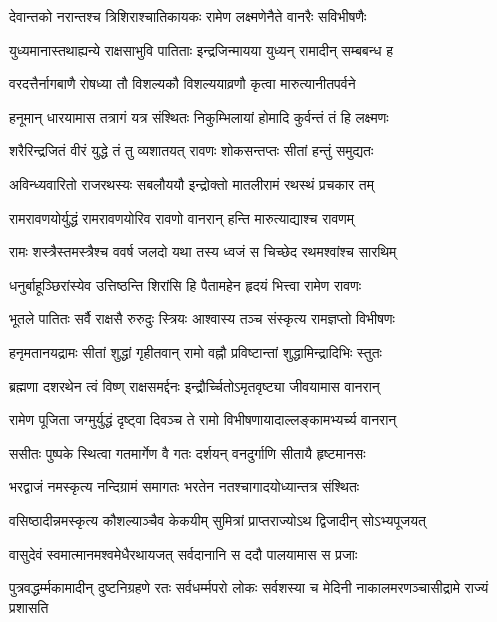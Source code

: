 \twolineshloka
{देवान्तको नरान्तश्च त्रिशिराश्चातिकायकः}
{रामेण लक्ष्मणेनैते वानरैः सविभीषणैः}%

\twolineshloka
{युध्यमानास्तथाह्यन्ये राक्षसाभुवि पातिताः}
{इन्द्रजिन्मायया युध्यन् रामादीन् सम्बबन्ध ह}%

\twolineshloka
{वरदत्तैर्नागबाणै रोषध्या तौ विशल्यकौ}
{विशल्ययाव्रणौ कृत्वा मारुत्यानीतपर्वने}%

\twolineshloka
{हनूमान् धारयामास तत्रागं यत्र संश्थितः}
{निकुम्भिलायां होमादि कुर्वन्तं तं हि लक्ष्मणः}%

\twolineshloka
{शरैरिन्द्रजितं वीरं युद्धे तं तु व्यशातयत्}
{रावणः शोकसन्तप्तः सीतां हन्तुं समुद्यतः}%

\twolineshloka
{अविन्ध्यवारितो राजरथस्यः सबलौययौ}
{इन्द्रोक्तो मातलीरामं रथस्थं प्रचकार तम्}%

\twolineshloka
{रामरावणयोर्युद्धं रामरावणयोरिव}
{रावणो वानरान् हन्ति मारुत्याद्याश्च रावणम्}%

\twolineshloka
{रामः शस्त्रैस्तमस्त्रैश्च ववर्ष जलदो यथा}
{तस्य ध्वजं स चिच्छेद रथमश्वांश्च सारथिम्}%

\twolineshloka
{धनुर्बाहूञ्छिरांस्येव उत्तिष्ठन्ति शिरांसि हि}
{पैतामहेन हृदयं भित्त्वा रामेण रावणः}%

\twolineshloka
{भूतले पातितः सर्वै राक्षसै रुरुदुः स्त्रियः}
{आश्वास्य तञ्च संस्कृत्य रामज्ञप्तो विभीषणः}%

\twolineshloka
{हनृमतानयद्रामः सीतां शुद्धां गृहीतवान्}
{रामो वह्नौ प्रविष्टान्तां शुद्धामिन्द्रादिभिः स्तुतः}%

\twolineshloka
{ब्रह्मणा दशरथेन त्वं विष्ण् राक्षसमर्द्दनः}
{इन्द्रौर्च्चितोऽमृतवृष्ट्या जीवयामास वानरान्}%

\twolineshloka
{रामेण पूजिता जग्मुर्युद्धं दृष्ट्वा दिवञ्च ते }
{रामो विभीषणायादाल्लङ्कामभ्यर्च्य वानरान्}%

\twolineshloka
{ससीतः पुष्पके स्थित्वा गतमार्गेण वै गतः}
{दर्शयन् वनदुर्गाणि सीतायै हृष्टमानसः}%

\twolineshloka
{भरद्वाजं नमस्कृत्य नन्दिग्रामं समागतः}
{भरतेन नतश्चागादयोध्यान्तत्र संश्थितः}%

\twolineshloka
{वसिष्ठादीन्नमस्कृत्य कौशल्याञ्चैव केकयीम् }
{सुमित्रां प्राप्तराज्योऽथ द्विजादीन् सोऽभ्यपूजयत्}%

\twolineshloka
{वासुदेवं स्वमात्मानमश्वमेधैरथायजत्}
{सर्वदानानि स ददौ पालयामास स प्रजाः}%

\threelineshloka
{पुत्रवद्धर्म्मकामादीन् दुष्टनिग्रहणे रतः}
{सर्वधर्म्मपरो लोकः सर्वशस्या च मेदिनी}
{नाकालमरणञ्चासीद्रामे राज्यं प्रशासति} %

